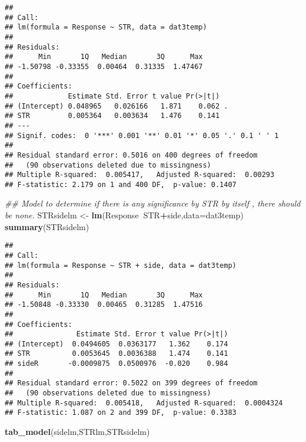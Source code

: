 \documentclass[
]{article}
\newenvironment{Shaded}{\begin{snugshade}}{\end{snugshade}}
\newcommand{\CommentTok}[1]{\textcolor[rgb]{0.56,0.35,0.01}{\textit{#1}}}
\newcommand{\DataTypeTok}[1]{\textcolor[rgb]{0.13,0.29,0.53}{#1}}
\newcommand{\KeywordTok}[1]{\textcolor[rgb]{0.13,0.29,0.53}{\textbf{#1}}}
\newcommand{\NormalTok}[1]{#1}
\newcommand{\OperatorTok}[1]{\textcolor[rgb]{0.81,0.36,0.00}{\textbf{#1}}}
\newcommand{\StringTok}[1]{\textcolor[rgb]{0.31,0.60,0.02}{#1}}
\begin{document}
\begin{verbatim}
## 
## Call:
## lm(formula = Response ~ STR, data = dat3temp)
## 
## Residuals:
##      Min       1Q   Median       3Q      Max 
## -1.50798 -0.33355  0.00464  0.31335  1.47467 
## 
## Coefficients:
##             Estimate Std. Error t value Pr(>|t|)  
## (Intercept) 0.048965   0.026166   1.871    0.062 .
## STR         0.005364   0.003634   1.476    0.141  
## ---
## Signif. codes:  0 '***' 0.001 '**' 0.01 '*' 0.05 '.' 0.1 ' ' 1
## 
## Residual standard error: 0.5016 on 400 degrees of freedom
##   (90 observations deleted due to missingness)
## Multiple R-squared:  0.005417,   Adjusted R-squared:  0.00293 
## F-statistic: 2.179 on 1 and 400 DF,  p-value: 0.1407
\end{verbatim}

\begin{Shaded}
\begin{Highlighting}[]
\CommentTok{## Model to determine if there is any significance by STR by itself , there should be none.}
\NormalTok{STRsidelm <-}\StringTok{ }\KeywordTok{lm}\NormalTok{(Response}\OperatorTok{~}\NormalTok{STR}\OperatorTok{+}\NormalTok{side,}\DataTypeTok{data=}\NormalTok{dat3temp)}
\KeywordTok{summary}\NormalTok{(STRsidelm)}
\end{Highlighting}
\end{Shaded}

\begin{verbatim}
## 
## Call:
## lm(formula = Response ~ STR + side, data = dat3temp)
## 
## Residuals:
##      Min       1Q   Median       3Q      Max 
## -1.50848 -0.33330  0.00465  0.31285  1.47516 
## 
## Coefficients:
##               Estimate Std. Error t value Pr(>|t|)
## (Intercept)  0.0494605  0.0363177   1.362    0.174
## STR          0.0053645  0.0036388   1.474    0.141
## sideR       -0.0009875  0.0500976  -0.020    0.984
## 
## Residual standard error: 0.5022 on 399 degrees of freedom
##   (90 observations deleted due to missingness)
## Multiple R-squared:  0.005418,   Adjusted R-squared:  0.0004324 
## F-statistic: 1.087 on 2 and 399 DF,  p-value: 0.3383
\end{verbatim}

\begin{Shaded}
\begin{Highlighting}[]
\KeywordTok{tab_model}\NormalTok{(sidelm,STRlm,STRsidelm)}
\end{Highlighting}
\end{Shaded}

~
\end{document}
